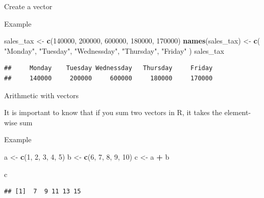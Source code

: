 \documentclass[
  ignorenonframetext,
]{beamer}
\newenvironment{Shaded}{\begin{snugshade}}{\end{snugshade}}
\newcommand{\DecValTok}[1]{\textcolor[rgb]{0.00,0.00,0.81}{#1}}
\newcommand{\KeywordTok}[1]{\textcolor[rgb]{0.13,0.29,0.53}{\textbf{#1}}}
\newcommand{\NormalTok}[1]{#1}
\newcommand{\OperatorTok}[1]{\textcolor[rgb]{0.81,0.36,0.00}{\textbf{#1}}}
\newcommand{\StringTok}[1]{\textcolor[rgb]{0.31,0.60,0.02}{#1}}
\begin{document}
\begin{frame}[fragile]{Create a vector}
\protect\hypertarget{create-a-vector-1}{}

\begin{block}{Example}

\begin{Shaded}
\begin{Highlighting}[]
\NormalTok{sales_tax <-}\StringTok{ }\KeywordTok{c}\NormalTok{(}\DecValTok{140000}\NormalTok{, }\DecValTok{200000}\NormalTok{, }\DecValTok{600000}\NormalTok{, }\DecValTok{180000}\NormalTok{, }\DecValTok{170000}\NormalTok{)}
\KeywordTok{names}\NormalTok{(sales_tax) <-}\StringTok{ }\KeywordTok{c}\NormalTok{(}
  \StringTok{"Monday"}\NormalTok{, }\StringTok{"Tuesday"}\NormalTok{, }\StringTok{"Wednessday"}\NormalTok{,}
  \StringTok{"Thursday"}\NormalTok{, }\StringTok{"Friday"}
\NormalTok{)}
\NormalTok{sales_tax}
\end{Highlighting}
\end{Shaded}

\begin{verbatim}
##     Monday    Tuesday Wednessday   Thursday     Friday 
##     140000     200000     600000     180000     170000
\end{verbatim}

\end{block}

\end{frame}

\begin{frame}[fragile]{Arithmetic with vectors}
\protect\hypertarget{arithmetic-with-vectors}{}

It is important to know that if you sum two vectors in R, it takes the
element-wise sum

\begin{block}{Example}

\begin{Shaded}
\begin{Highlighting}[]
\NormalTok{a <-}\StringTok{ }\KeywordTok{c}\NormalTok{(}\DecValTok{1}\NormalTok{, }\DecValTok{2}\NormalTok{, }\DecValTok{3}\NormalTok{, }\DecValTok{4}\NormalTok{, }\DecValTok{5}\NormalTok{)}
\NormalTok{b <-}\StringTok{ }\KeywordTok{c}\NormalTok{(}\DecValTok{6}\NormalTok{, }\DecValTok{7}\NormalTok{, }\DecValTok{8}\NormalTok{, }\DecValTok{9}\NormalTok{, }\DecValTok{10}\NormalTok{)}
\NormalTok{c <-}\StringTok{ }\NormalTok{a }\OperatorTok{+}\StringTok{ }\NormalTok{b}
\end{Highlighting}
\end{Shaded}

\begin{Shaded}
\begin{Highlighting}[]
\NormalTok{c}
\end{Highlighting}
\end{Shaded}

\begin{verbatim}
## [1]  7  9 11 13 15
\end{verbatim}

\end{block}

\end{frame}
\end{document}
